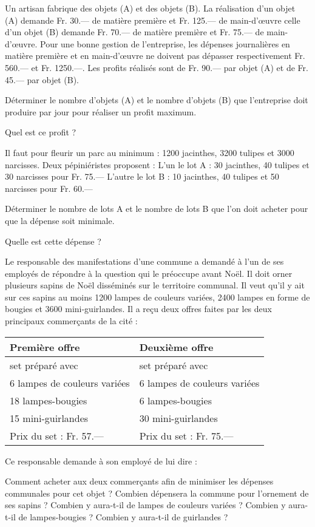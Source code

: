 \begin{exercice}
Un artisan fabrique des objets (A) et des objets (B).
La réalisation d’un objet (A) demande Fr. 30.— de matière première et Fr. 125.— de main-d’œuvre celle d’un objet (B) demande Fr. 70.— de matière première et Fr. 75.— de main-d’œuvre.
Pour une bonne gestion de l’entreprise, les dépenses journalières en matière première et en main-d’œuvre ne doivent pas dépasser respectivement Fr. 560.— et Fr. 1250.—. Les profits réalisés sont de Fr. 90.— par objet (A) et de Fr. 45.— par objet (B). 

Déterminer le nombre d’objets (A) et le nombre d’objets (B) que l’entreprise doit produire par jour pour réaliser un profit maximum.

Quel est ce profit ?
\end{exercice}

\begin{exercice}
Il faut pour fleurir un parc au minimum : 1200 jacinthes, 3200 tulipes et 3000 narcisses.
Deux pépiniéristes proposent :
L’un le lot A     : 30 jacinthes, 40 tulipes et 30 narcisses pour Fr. 75.—	
L’autre le lot B : 10 jacinthes, 40 tulipes et 50 narcisses pour Fr. 60.—

Déterminer le nombre de lots A et le nombre de lots B que l’on doit acheter pour que la dépense soit minimale.

Quelle est cette dépense ?
\end{exercice}

\begin{exercice}
Le responsable des manifestations d’une commune a demandé à l’un de ses employés de répondre à la question qui le préoccupe avant Noël.
Il doit orner plusieurs sapins de Noël disséminés sur le territoire communal. Il veut qu’il y ait sur ces sapins au moins 1200 lampes de couleurs variées, 2400 lampes en forme de bougies et 3600 mini-guirlandes. Il a reçu deux offres faites par les deux principaux commerçants de la cité :

\begin{tabular}{|l|l|}
\hline
Première offre               & Deuxième offre               \\ \hline
set préparé avec             & set préparé avec             \\ \hline
6 lampes de couleurs variées & 6 lampes de couleurs variées \\ \hline
18 lampes-bougies            & 6 lampes-bougies             \\ \hline
15 mini-guirlandes           & 30 mini-guirlandes           \\ \hline
Prix du set : Fr. 57.—       & Prix du set : Fr. 75.—       \\ \hline
\end{tabular}

Ce responsable demande à son employé de lui dire :

Comment acheter aux deux commerçants afin de minimiser les dépenses communales pour cet objet ?
Combien dépensera la commune pour l’ornement de ses sapins ?
Combien y aura-t-il de lampes de couleurs variées ?
Combien y aura-t-il de lampes-bougies ?
Combien y aura-t-il de guirlandes ?
\end{exercice}

